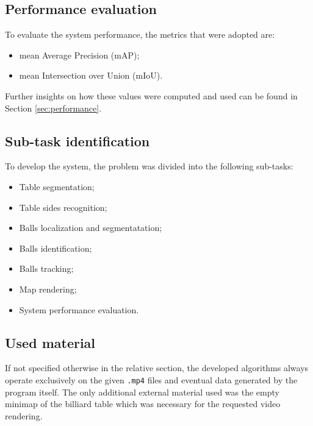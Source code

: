 \subsection{Performance evaluation}
To evaluate the system performance, the metrics that were adopted are:
\begin{itemize}
    \item mean Average Precision (mAP);
    \item mean Intersection over Union (mIoU).
\end{itemize}
\begin{flushleft}
Further insights on how these values were computed and used can be found in Section \ref{sec:performance}.
\end{flushleft}


\subsection{Sub-task identification}
To develop the system, the problem was divided into the following sub-tasks:
\begin{itemize}
    \item Table segmentation;
    \item Table sides recognition;
    \item Balls localization and segmentatation;
    \item Balls identification;
    \item Balls tracking;
    \item Map rendering;
    \item System performance evaluation.
\end{itemize}



\subsection{Used material}
If not specified otherwise in the relative section, the developed algorithms always operate exclusively on the given \verb|.mp4| files and
eventual data generated by the program itself. The only additional external material used was the empty minimap of the billiard table which was necessary for
the requested video rendering.